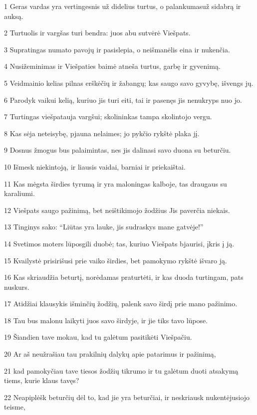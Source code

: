 \par 1 Geras vardas yra vertingesnis už didelius turtus, o palankumas­už sidabrą ir auksą. 
\par 2 Turtuolis ir vargšas turi bendra: juos abu sutvėrė Viešpats. 
\par 3 Supratingas numato pavojų ir pasislepia, o neišmanėlis eina ir nukenčia. 
\par 4 Nusižeminimas ir Viešpaties baimė atneša turtus, garbę ir gyvenimą. 
\par 5 Veidmainio kelias pilnas erškėčių ir žabangų; kas saugo savo gyvybę, išvengs jų. 
\par 6 Parodyk vaikui kelią, kuriuo jis turi eiti, tai ir pasenęs jis nenukryps nuo jo. 
\par 7 Turtingas viešpatauja vargšui; skolininkas tampa skolintojo vergu. 
\par 8 Kas sėja neteisybę, pjauna nelaimes; jo pykčio rykštė plaka jį. 
\par 9 Dosnus žmogus bus palaimintas, nes jis dalinasi savo duona su beturčiu. 
\par 10 Išmesk niekintoją, ir liausis vaidai, barniai ir priekaištai. 
\par 11 Kas mėgsta širdies tyrumą ir yra maloningas kalboje, tas draugaus su karaliumi. 
\par 12 Viešpats saugo pažinimą, bet neištikimojo žodžius Jis paverčia niekais. 
\par 13 Tinginys sako: “Liūtas yra lauke, jis sudraskys mane gatvėje!” 
\par 14 Svetimos moters lūpos­gili duobė; tas, kuriuo Viešpats bjaurisi, įkris į ją. 
\par 15 Kvailystė prisirišusi prie vaiko širdies, bet pamokymo rykštė išvaro ją. 
\par 16 Kas skriaudžia beturtį, norėdamas praturtėti, ir kas duoda turtingam, pats nuskurs. 
\par 17 Atidžiai klausykis išminčių žodžių, palenk savo širdį prie mano pažinimo. 
\par 18 Tau bus malonu laikyti juos savo širdyje, ir jie tiks tavo lūpose. 
\par 19 Šiandien tave mokau, kad tu galėtum pasitikėti Viešpačiu. 
\par 20 Ar aš neužrašiau tau prakilnių dalykų apie patarimus ir pažinimą, 
\par 21 kad pamokyčiau tave tiesos žodžių tikrumo ir tu galėtum duoti atsakymą tiems, kurie klaus tavęs? 
\par 22 Neapiplėšk beturčių dėl to, kad jie yra beturčiai, ir neskriausk nukentėjusiojo teisme, 
